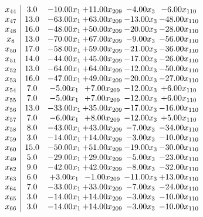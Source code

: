 \documentclass[8pt]{article}
\begin{document}
\[\begin{array}{c| c c@{\hskip 2pt} c@{\hskip 2pt} c@{\hskip 2pt} c@{\hskip 2pt} }
 x_{44}   &  3.0 & -10.00 x_{1} & + 11.00 x_{209} & -4.00 x_{3} & -6.00 x_{110}\\
 x_{47}   &  13.0 & -63.00 x_{1} & + 63.00 x_{209} & -13.00 x_{3} & -48.00 x_{110}\\
 x_{48}   &  16.0 & -48.00 x_{1} & + 50.00 x_{209} & -20.00 x_{3} & -28.00 x_{110}\\
 x_{8}   &  13.0 & -70.00 x_{1} & + 67.00 x_{209} & -9.00 x_{3} & -56.00 x_{110}\\
 x_{50}   &  17.0 & -58.00 x_{1} & + 59.00 x_{209} & -21.00 x_{3} & -36.00 x_{110}\\
 x_{51}   &  14.0 & -44.00 x_{1} & + 45.00 x_{209} & -17.00 x_{3} & -26.00 x_{110}\\
 x_{52}   &  13.0 & -64.00 x_{1} & + 64.00 x_{209} & -12.00 x_{3} & -50.00 x_{110}\\
 x_{53}   &  16.0 & -47.00 x_{1} & + 49.00 x_{209} & -20.00 x_{3} & -27.00 x_{110}\\
 x_{54}   &  7.0 & -5.00 x_{1} & +  7.00 x_{209} & -12.00 x_{3} & +  6.00 x_{110}\\
 x_{55}   &  7.0 & -5.00 x_{1} & +  7.00 x_{209} & -12.00 x_{3} & +  6.00 x_{110}\\
 x_{56}   &  13.0 & -33.00 x_{1} & + 35.00 x_{209} & -17.00 x_{3} & -16.00 x_{110}\\
 x_{57}   &  7.0 & -6.00 x_{1} & +  8.00 x_{209} & -12.00 x_{3} & +  5.00 x_{110}\\
 x_{58}   &  8.0 & -43.00 x_{1} & + 43.00 x_{209} & -7.00 x_{3} & -34.00 x_{110}\\
 x_{59}   &  3.0 & -14.00 x_{1} & + 14.00 x_{209} & -3.00 x_{3} & -10.00 x_{110}\\
 x_{60}   &  15.0 & -50.00 x_{1} & + 51.00 x_{209} & -19.00 x_{3} & -30.00 x_{110}\\
 x_{49}   &  5.0 & -29.00 x_{1} & + 29.00 x_{209} & -5.00 x_{3} & -23.00 x_{110}\\
 x_{62}   &  9.0 & -42.00 x_{1} & + 42.00 x_{209} & -8.00 x_{3} & -32.00 x_{110}\\
 x_{63}   &  6.0 & +  3.00 x_{1} & -1.00 x_{209} & -11.00 x_{3} & + 13.00 x_{110}\\
 x_{64}   &  7.0 & -33.00 x_{1} & + 33.00 x_{209} & -7.00 x_{3} & -24.00 x_{110}\\
 x_{65}   &  3.0 & -14.00 x_{1} & + 14.00 x_{209} & -3.00 x_{3} & -10.00 x_{110}\\
 x_{66}   &  3.0 & -14.00 x_{1} & + 14.00 x_{209} & -3.00 x_{3} & -10.00 x_{110}\\

\end{array}\]
\end{document}
